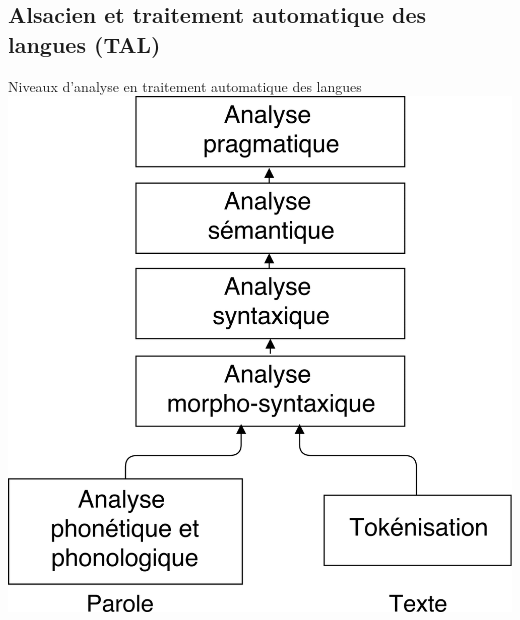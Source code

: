 \documentclass[french]{beamer}
\begin{document}
\subsection{Alsacien et traitement automatique des langues (TAL)}

\begin{frame}{Niveaux d'analyse en traitement automatique des langues}
  \centering
  \includegraphics[scale=0.12]{figures/niveaux-0-trans.png}
\end{frame}
\end{document}
